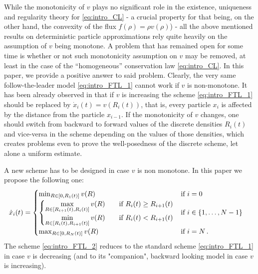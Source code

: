 \documentclass[reqno,oneside]{amsart}
\theoremstyle{plain}
\begin{document}
While the monotonicity of $v$ plays no significant role in the existence,  uniqueness and regularity theory for \eqref{eq:intro_CL} - a crucial property for that being, on the other hand, the convexity of the flux $f(\rho)=\rho v(\rho)$) - all the above mentioned results on deterministic particle approximations rely quite heavily on the assumption of $v$ being monotone. A problem that has remained open for some time is whether or not such monotonicity assumption on $v$ may be removed, at least in the case of the \enquote{homogeneous} conservation law \eqref{eq:intro_CL}. In this paper, we provide a positive answer to said problem. Clearly, the very same follow-the-leader model \eqref{eq:intro_FTL_1} cannot work if $v$ is non-monotone. It has been already observed in \cite{DR} that if $v$ is increasing the scheme \eqref{eq:intro_FTL_1} should be replaced by $\dot{x}_i(t)=v(R_i(t))$, that is, every particle $x_i$ is affected by the distance from the particle $x_{i-1}$. If the monotonicity of $v$ changes, one should switch from backward to forward values of the discrete densities $R_i(t)$ and vice-versa in the scheme depending on the values of those densities, which creates problems even to prove the well-posedness of the discrete scheme, let alone a uniform estimate. 

A new scheme has to be designed in case $v$ is non monotone. In this paper we propose the following one:
\begin{align}\label{eq:intro_FTL_2}
& \dot{x}_i(t)=
\begin{cases}
    \min_{R\in[0,R_1(t)]}v(R) & \hbox{if $i=0$}\\
    \begin{cases}
\displaystyle{\max_{R\in[R_{i+1}(t),R_i(t)]}v(R)} & \quad\hbox{if $R_i(t)\geq R_{i+1}(t)$}\\
        \displaystyle{\min_{R\in [R_i(t),R_{i+1}(t)]}v(R)} &\quad \hbox{if $R_i(t)<R_{i+1}(t)$}
    \end{cases} & \hbox{if $i\in \{1,\ldots,N-1\}$}\\
    \max_{R\in [0,R_N(t)]}v(R) & \hbox{if $i=N$}\,.
\end{cases}
\end{align}
The scheme \eqref{eq:intro_FTL_2} reduces to the standard scheme \eqref{eq:intro_FTL_1} in case $v$ is  decreasing (and to its "companion", backward looking model in case $v$ is increasing).
\end{document}
